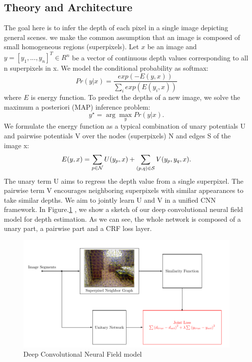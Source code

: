 \documentclass[10pt,twocolumn,letterpaper]{article}
\begin{document}
\subsection{Theory and Architecture}
The goal here is to infer the depth of each pixel in a single image depicting 
general scenes. we make the common assumption that an image is composed of small 
homogeneous regions (superpixels). 
Let $x$ be an image and $y=[y_1,...,y_n]^T\in R^n$ be a vector of continuous 
depth values corresponding to all n superpixels in x. We model the conditional 
probability as softmax:
\begin{equation}
Pr(y|x)=\frac{exp(-E(y,x))}{\sum_i 
exp(E(y_i,x))}
\end{equation}
where $E$ is energy function.
To predict the depths of a new image, we solve the maximum a posteriori (MAP) 
inference problem: 
\begin{equation}
 \label{eq:inference}
y^{\star}=\arg\max\limits_y Pr(y|x). 
\end{equation}
We formulate the energy function as a 
typical combination of unary potentials U and pairwise potentials V over the 
nodes (superpixels) N and edges S of the image x:
\begin{equation}\label{eq:energy}
E(y, x) = \sum_{p \in {\cal N} } U(y_{p}, x) 
	 + \sum_{(p,q) \in {\cal S}} V(y_{p}, y_{q}, x).
\end{equation}
The unary term U aims to regress the depth value from a single superpixel. The 
pairwise term V encourages neighboring superpixels with similar appearances 
to take similar depths. We aim to jointly learn U and V in a unified CNN 
framework.
In Figure.\ref{fig:arch} , we show a sketch of our deep convolutional
neural field model for depth estimation. As we can see, the whole network is 
composed of a unary part, a pairwise part and a CRF loss layer.
\begin{figure}
\includegraphics[width=.9\linewidth]{../presentation/arch.png}
\caption{Deep Convolutional Neural Field model}
\label{fig:arch}
\end{figure}
\end{document}
